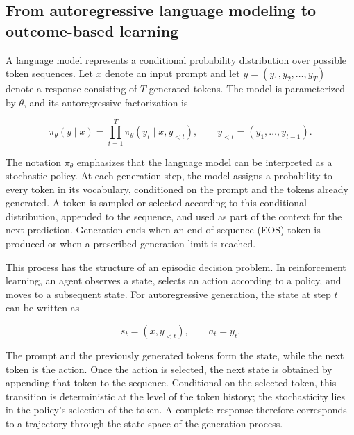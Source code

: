 
\subsection{From autoregressive language modeling to outcome-based learning}
\label{subsec:rlvr-autoregressive-foundation}

A language model represents a conditional probability distribution over
possible token sequences. Let \(x\) denote an input prompt and let
\(y=(y_1,y_2,\ldots,y_T)\) denote a response consisting of \(T\) generated
tokens. The model is parameterized by \(\theta\), and its autoregressive
factorization is

\begin{equation}
    \pi_\theta(y\mid x)
    =
    \prod_{t=1}^{T}
    \pi_\theta(y_t\mid x,y_{<t}),
    \qquad
    y_{<t}=(y_1,\ldots,y_{t-1}).
    \label{eq:rlvr-autoregressive-policy}
\end{equation}

The notation \(\pi_\theta\) emphasizes that the language model can be
interpreted as a stochastic policy. At each generation step, the model
assigns a probability to every token in its vocabulary, conditioned on the
prompt and the tokens already generated. A token is sampled or selected
according to this conditional distribution, appended to the sequence, and
used as part of the context for the next prediction. Generation ends when an
end-of-sequence (EOS) token is produced or when a prescribed generation limit
is reached.

This process has the structure of an episodic decision problem. In
reinforcement learning, an agent observes a state, selects an action according
to a policy, and moves to a subsequent state. For autoregressive generation,
the state at step \(t\) can be written as

\begin{equation}
    s_t=(x,y_{<t}),
    \qquad
    a_t=y_t.
    \label{eq:rlvr-state-action}
\end{equation}

The prompt and the previously generated tokens form the state, while the
next token is the action. Once the action is selected, the next state is
obtained by appending that token to the sequence. Conditional on the selected
token, this transition is deterministic at the level of the token history;
the stochasticity lies in the policy's selection of the token. A complete
response therefore corresponds to a trajectory through the state space of
the generation process.


